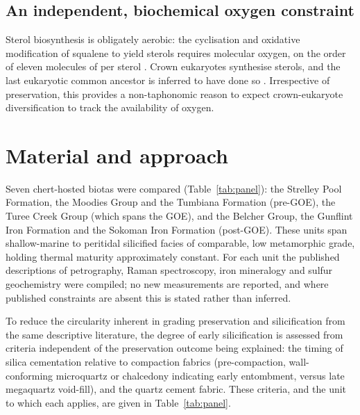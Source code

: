 \documentclass[11pt]{article}
\begin{document}
\subsection{An independent, biochemical oxygen constraint}

Sterol biosynthesis is obligately aerobic: the cyclisation and oxidative modification of squalene to
yield sterols requires molecular oxygen, on the order of eleven molecules of  per sterol
\citep{Gold2017,Desmond2009}. Crown eukaryotes synthesise sterols, and the last eukaryotic common
ancestor is inferred to have done so \citep{Desmond2009}. Irrespective of preservation, this provides
a non-taphonomic reason to expect crown-eukaryote diversification to track the availability of oxygen.

\section{Material and approach}

Seven chert-hosted biotas were compared (Table~\ref{tab:panel}): the Strelley Pool Formation, the
Moodies Group and the Tumbiana Formation (pre-GOE), the Turee Creek Group (which spans the GOE), and
the Belcher Group, the Gunflint Iron Formation and the Sokoman Iron Formation (post-GOE). These units
span shallow-marine to peritidal silicified facies of comparable, low metamorphic grade, holding
thermal maturity approximately constant. For each unit the published descriptions of petrography,
Raman spectroscopy, iron mineralogy and sulfur geochemistry were compiled; no new measurements are
reported, and where published constraints are absent this is stated rather than inferred.

To reduce the circularity inherent in grading preservation and silicification from the same
descriptive literature, the degree of early silicification is assessed from criteria independent of
the preservation outcome being explained: the timing of silica cementation relative to compaction
fabrics (pre-compaction, wall-conforming microquartz or chalcedony indicating early entombment,
versus late megaquartz void-fill), and the quartz cement fabric. These criteria, and the unit to
which each applies, are given in Table~\ref{tab:panel}.
\end{document}

